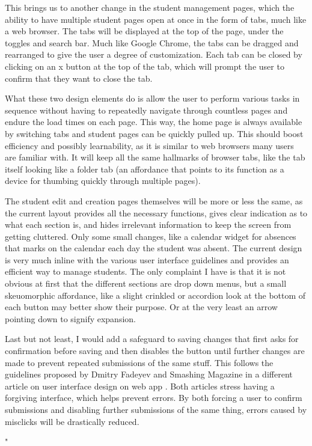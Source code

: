 \documentclass{article}
\begin{document}
This brings us to another change in the student management pages, which the ability to have multiple student pages open at once in the form of tabs, much like a web browser. The tabs will be displayed at the top of the page, under the toggles and search bar. Much like Google Chrome, the tabs can be dragged and rearranged to give the user a degree of customization. Each tab can be closed by clicking on an x button at the top of the tab, which will prompt the user to confirm that they want to close the tab.

What these two design elements do is allow the user to perform various tasks in sequence without having to repeatedly navigate through countless pages and endure the load times on each page. This way, the home page is always available by switching tabs and student pages can be quickly pulled up. This should boost efficiency and possibly learnability, as it is similar to web browsers many users are familiar with. It will keep all the same hallmarks of browser tabs, like the tab itself looking like a folder tab (an affordance that points to its function as a device for thumbing quickly through multiple pages). 

The student edit and creation pages themselves will be more or less the same, as the current layout provides all the necessary functions, gives clear indication as to what each section is, and hides irrelevant information to keep the screen from getting cluttered. Only some small changes, like a calendar widget for absences that marks on the calendar each day the student was absent. The current design is very much inline with the various user interface guidelines and provides an efficient way to manage students. The only complaint I have is that it is not obvious at first that the different sections are drop down menus, but a small skeuomorphic affordance, like a slight crinkled or accordion look at the bottom of each button may better show their purpose. Or at the very least an arrow pointing down to signify expansion.

Last but not least, I would add a safeguard to saving changes that first asks for confirmation before saving and then disables the button until further changes are made to prevent repeated submissions of the same stuff. This follows the guidelines proposed by Dmitry Fadeyev \cite{techniques} and Smashing Magazine in  a different article on user interface design on web app \cite{modern}. Both articles stress having a forgiving interface, which helps prevent errors. By both forcing a user to confirm submissions and disabling further submissions of the same thing, errors caused by misclicks will be drastically reduced.


"
\end{document}
